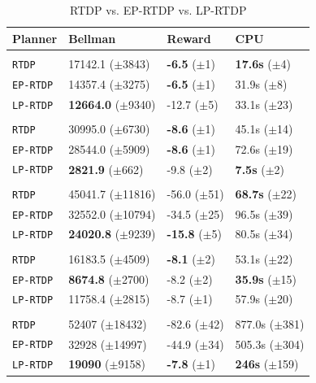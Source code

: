\documentclass[11pt]{article}
\begin{document}
\begin{table}
\centering
{}
\small
\begin{tabular}{@{}llll@{}}\toprule
Planner & Bellman & Reward & CPU \\ \midrule
&\hspace{-10mm}{\it Mining Task} \\
\texttt{RTDP} & 17142.1 ($\pm$3843) 		& {\bf -6.5} ($\pm$1)  & {\bf 17.6s}   ($\pm$4) \\
\texttt{EP-RTDP} 	& 14357.4 ($\pm$3275) 		& {\bf -6.5}   ($\pm$1) & 31.9s   ($\pm$8) \\
\texttt{LP-RTDP} 	& {\bf 12664.0} ($\pm$9340) 	& -12.7 ($\pm$5) & 33.1s   ($\pm$23) \\\hline
&\hspace{-10mm}{\it Smelting Task} \\
\texttt{RTDP} 	& 30995.0 ($\pm$6730) 		& {\bf -8.6}   ($\pm$1) & 45.1s   ($\pm$14) \\
\texttt{EP-RTDP} 	& 28544.0 ($\pm$5909) 		& {\bf -8.6}   ($\pm$1) & 72.6s   ($\pm$19) \\ 
\texttt{LP-RTDP} 	& {\bf 2821.9} 	 ($\pm$662) 	& -9.8   ($\pm$2) & {\bf 7.5s}  ($\pm$2) \\ \hline
&\hspace{-10mm}{\it Wall Traversal Task} \\
\texttt{RTDP} & 45041.7 ($\pm$11816) 		& -56.0   ($\pm$51) & {\bf 68.7s}   ($\pm$22) \\
\texttt{EP-RTDP} 	& 32552.0 ($\pm$10794) 		& -34.5   ($\pm$25) & 96.5s   ($\pm$39) \\ 
\texttt{LP-RTDP} 	& {\bf 24020.8} ($\pm$9239) 	& {\bf -15.8}   ($\pm$5) & 80.5s   ($\pm$34) \\ \hline
&\hspace{-10mm}{\it Trench Traversal Task} \\
\texttt{RTDP}  	& 16183.5 ($\pm$4509) 		& {\bf -8.1}   ($\pm$2) & 53.1s   ($\pm$22) \\
\texttt{EP-RTDP} 	& {\bf 8674.8} 	($\pm$2700) 	& -8.2   ($\pm$2) & {\bf 35.9s}   ($\pm$15) \\ 
\texttt{LP-RTDP} 	& 11758.4 ($\pm$2815) 		& -8.7   ($\pm$1) & 57.9s   ($\pm$20) \\ \hline
&\hspace{-10mm}{\it Plane Traversal Task} \\
\texttt{RTDP} & 52407 ($\pm$18432) 		& -82.6   ($\pm$42) & 877.0s   ($\pm$381) \\
\texttt{EP-RTDP} 	& 32928 ($\pm$14997) 		& -44.9   ($\pm$34) & 505.3s   ($\pm$304) \\
\texttt{LP-RTDP} 	& {\bf 19090} 	 ($\pm$9158) 	& {\bf-7.8}   ($\pm$1) & {\bf 246s}  ($\pm$159) \\
\bottomrule
\end{tabular}
\caption{RTDP vs. EP-RTDP vs. LP-RTDP}
\label{table:minecraft_results}
\end{table}
\end{document}
